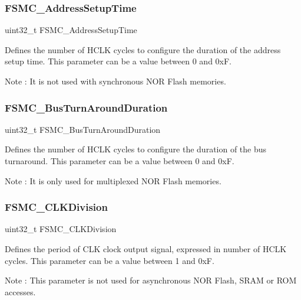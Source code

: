 \subsubsection{\texorpdfstring{FSMC\_AddressSetupTime}{FSMC\_AddressSetupTime}}
{\footnotesize\ttfamily uint32\+\_\+t F\+S\+M\+C\+\_\+\+Address\+Setup\+Time}

Defines the number of H\+C\+LK cycles to configure the duration of the address setup time. This parameter can be a value between 0 and 0xF. \begin{DoxyNote}{Note}
\+: It is not used with synchronous N\+OR Flash memories. 
\end{DoxyNote}
\mbox{\label{struct_f_s_m_c___n_o_r_s_r_a_m_timing_init_type_def_a015f5751cbb8c607102d8c735988c5c7}} 
\subsubsection{\texorpdfstring{FSMC\_BusTurnAroundDuration}{FSMC\_BusTurnAroundDuration}}
{\footnotesize\ttfamily uint32\+\_\+t F\+S\+M\+C\+\_\+\+Bus\+Turn\+Around\+Duration}

Defines the number of H\+C\+LK cycles to configure the duration of the bus turnaround. This parameter can be a value between 0 and 0xF. \begin{DoxyNote}{Note}
\+: It is only used for multiplexed N\+OR Flash memories. 
\end{DoxyNote}
\mbox{\label{struct_f_s_m_c___n_o_r_s_r_a_m_timing_init_type_def_a4258c6027193e72763ab139cfd3af065}} 
\subsubsection{\texorpdfstring{FSMC\_CLKDivision}{FSMC\_CLKDivision}}
{\footnotesize\ttfamily uint32\+\_\+t F\+S\+M\+C\+\_\+\+C\+L\+K\+Division}

Defines the period of C\+LK clock output signal, expressed in number of H\+C\+LK cycles. This parameter can be a value between 1 and 0xF. \begin{DoxyNote}{Note}
\+: This parameter is not used for asynchronous N\+OR Flash, S\+R\+AM or R\+OM accesses. 
\end{DoxyNote}
\mbox{\label{struct_f_s_m_c___n_o_r_s_r_a_m_timing_init_type_def_a656a0608f822088c5a94c926447a5e06}} 
